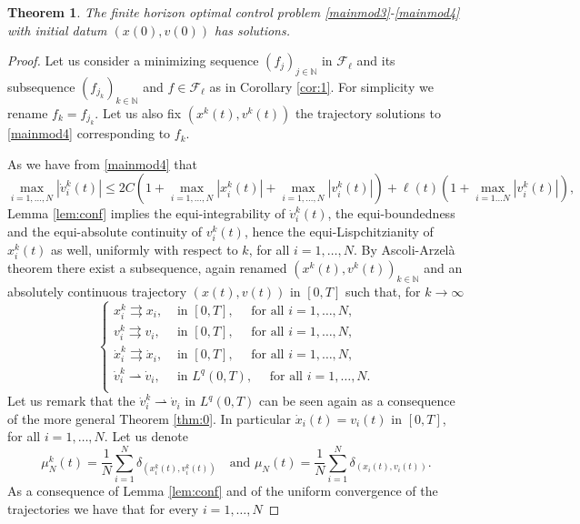 \documentclass[11pt]{article}
\theoremstyle{plain}
\newtheorem{theorem}{Theorem}[section]
\theoremstyle{definition}
\theoremstyle{remark}
\numberwithin{equation}{section}
\begin{document}
\begin{theorem}\label{thm:4}
The finite horizon optimal control problem \eqref{mainmod3}-\eqref{mainmod4} with initial datum $(x(0),v(0))$ has solutions.
\end{theorem}
\begin{proof}
Let us consider a minimizing sequence $(f_j)_{j \in \mathbb N}$ in $\mathcal F_\ell$ and its subsequence
$(f_{j_k})_{k \in \mathbb N}$ and $f \in \mathcal F_\ell$ as in Corollary \ref{cor:1}. For simplicity we rename $f_k = f_{j_k}$.
Let us also fix $(x^k(t),v^k(t))$ the trajectory solutions to \eqref{mainmod4} corresponding to $f_k$. 

As we have from \eqref{mainmod4} that
$$
\max_{i=1,\dots ,N} |\dot v_i^k(t)| \leq 2 C(1+ \max_{i=1,\dots, N} |x_i^k(t)| +  \max_{i=1,\dots, N} |v_i^k(t)|) + \ell(t)(1+ \max_{i=1\dots N} |v_i^k(t)|),
$$
 Lemma \ref{lem:conf} implies the equi-integrability of $\dot v_i^k(t)$, the equi-boundedness and the equi-absolute continuity of $v_i^k(t)$, hence the equi-Lispchitzianity of $x_i^k(t)$ as well, uniformly with 
respect to $k$, for all $i=1,\dots,N$. By Ascoli-Arzel\`a theorem there exist a subsequence, again renamed $(x^k(t),v^k(t))_{k \in \mathbb N}$
and an absolutely continuous trajectory $(x(t),v(t))$ in $[0,T]$ such that, for $k \to \infty$ 
\begin{equation}\label{unif}
\left \{
\begin{array}{ll}
x_i^k \rightrightarrows x_i, & \mbox{ in } [0,T], \quad \mbox{ for all } i=1,\dots,N,\\
v_i^k \rightrightarrows v_i, & \mbox{ in } [0,T], \quad \mbox{ for all } i=1,\dots,N,\\
\dot x_i^k \rightrightarrows \dot x_i, & \mbox{ in } [0,T], \quad \mbox{ for all } i=1,\dots,N,\\
\dot v_i^k \rightharpoonup \dot v_i, & \mbox{ in } L^q(0,T), \quad \mbox{ for all } i=1,\dots,N.\\
\end{array}
\right .
\end{equation}
Let us remark that the $\dot v_i^k \rightharpoonup \dot v_i$ in $L^q(0,T)$ can be seen again as a consequence of the more general Theorem \ref{thm:0}.
In particular $\dot x_i(t) = v_i(t)$ in $[0,T]$, for all $i=1,\dots,N$. 
Let us denote
$$
\mu_N^k(t) = \frac{1}{N} \sum_{i=1}^N \delta_{(x_i^k(t),v_i^k(t))} \quad \mbox{and }  \mu_N(t) = \frac{1}{N} \sum_{i=1}^N \delta_{(x_i(t),v_i(t))}.
$$
As a consequence of Lemma \ref{lem:conf} and of the uniform convergence of the trajectories we have that for every $i=1,\dots,N$

\end{proof}
\end{document}
